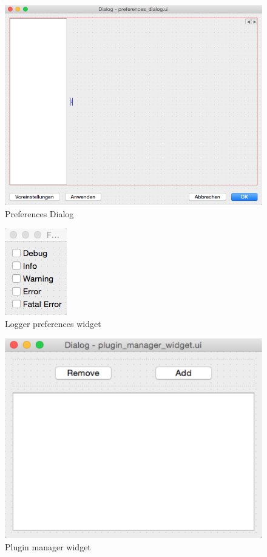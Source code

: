 \documentclass[a4paper]{scrreprt}
\begin{document}
\begin{figure}[hbt]
  \centering
  \includegraphics[scale=0.5]{images/preference_dialog_ui}
  \caption{Preferences Dialog}
  \label{img:pref-dialog}
\end{figure}

\begin{figure}[hbt]
  \centering
  \includegraphics[scale=0.5]{images/logger_settings_widget_ui}
  \caption{Logger preferences widget}
  \label{img:logger-widget}
\end{figure}

\begin{figure}[hbt]
  \centering
  \includegraphics[scale=0.5]{images/plugin_manager_widget_ui}
  \caption{Plugin manager widget}
  \label{img:plugin-widget}
\end{figure}
\end{document}
